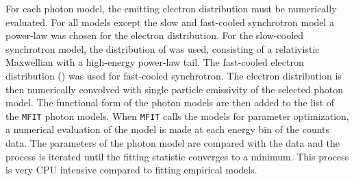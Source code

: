 For each photon model, the emitting electron distribution must be numerically
evaluated. For all models except the slow and fast-cooled synchrotron model a
power-law was chosen for the electron distribution. For the
slow-cooled synchrotron model, the distribution of
 was used, consisting of a relativistic
Maxwellian with a high-energy power-law tail. The fast-cooled electron distribution () was used for fast-cooled synchrotron. The electron
distribution is then numerically convolved with single particle
emissivity of the selected photon model. The functional form of the
photon models are then added to the list of the {\tt MFIT} photon
models. When {\tt MFIT} calls the models for parameter optimization, a
numerical evaluation of the model is made at each energy bin of the
counts data. The parameters of the photon model are compared with the
data and the process is iterated until the fitting statistic converges
to a minimum. This process is very CPU intensive compared to fitting
empirical models.

